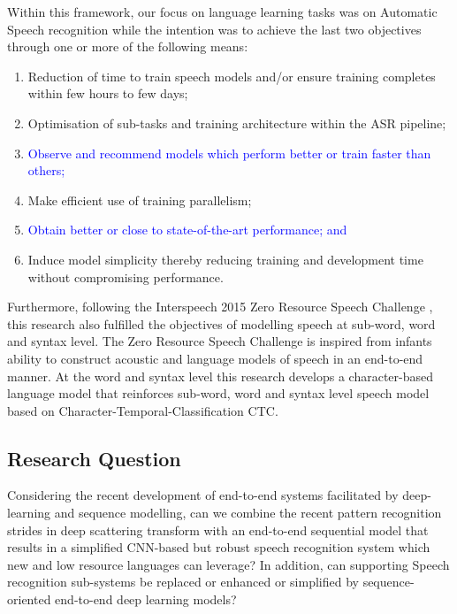 Within this framework, our focus on language learning tasks was on Automatic Speech recognition while the intention was to achieve the last two objectives through one or more of the following means:
\begin{enumerate}
    \item Reduction of time to train speech models and/or ensure training completes within few hours to few days;
    \item Optimisation of sub-tasks and training architecture within the ASR pipeline;
    \item \textcolor{blue}{Observe and recommend models which perform better or train faster than others;}
    \item Make efficient use of training parallelism;
    \item \textcolor{blue}{Obtain better or close to state-of-the-art performance; and}
    \item Induce model simplicity thereby reducing training and development time without compromising performance.
\end{enumerate}

Furthermore, following the Interspeech 2015 Zero Resource Speech Challenge \citep{versteegh2015zero}, this research also fulfilled the objectives of modelling speech at sub-word, word and syntax level. The Zero Resource Speech Challenge is inspired from infants ability to construct acoustic and language models of speech in an end-to-end manner. At the word and syntax level this research develops a character-based language model that reinforces sub-word, word and syntax level speech model based on Character-Temporal-Classification CTC.

\startblue
\subsection{Research Question}
Considering the recent development of end-to-end systems facilitated by deep-learning and sequence modelling, can we combine the recent pattern recognition strides in deep scattering transform with an end-to-end sequential model that results in a simplified CNN-based but robust speech recognition system which new and low resource languages can leverage?  In addition, can supporting Speech recognition sub-systems be replaced or enhanced or simplified by sequence-oriented end-to-end deep learning models?
\stopblue

